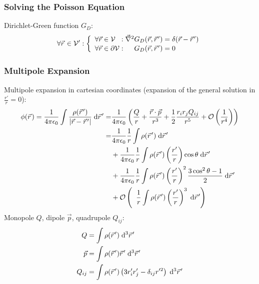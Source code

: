 		\subsubsection{Solving the Poisson Equation}
			\noindent
			Dirichlet-Green function $G_D$:
			\begin{equation}
				\forall\pvec{r}\in\mathcal{V}': \left\{\begin{array}{ll}
						\forall\vec{r}\in\mathcal{V}\phantom\partial:
						\Nabla^2 G_D(\vec{r},\pvec{r}') = \delta(\vec{r}-\pvec{r}') \\
						\forall\vec{r}\in\partial\mathcal{V}:
						\phantom{\Nabla^2}G_D(\vec{r},\pvec{r}') = 0
					\end{array}\right.
			\end{equation}

		\subsubsection{Multipole Expansion}
			\noindent
			Multipole expansion in cartesian coordinates (expansion of the general solution in $\frac{r'}{r}=0$):
			\begin{equation}
				\begin{aligned}
					\phi(\pvec{r}) = \frac{1}{4\pi\epsilon_0}\int\frac{\rho(\pvec{r}')}{\left|\vec{r}-\pvec{r}'\right|}\;\dd \pvec{r}'
					=& \frac{1}{4\pi\epsilon_0}\left(\frac{Q}{r} + \frac{\vec{r}\cdot\vec{p}}{r^3} + \frac{1}{2}\frac{r_i r_j Q_{ij}}{r^5} + \mathcal{O} \left(\frac{1}{r^4}\right)\right) \\
					=& \frac{1}{4\pi\epsilon_0}\frac{1}{r}\int\rho(\pvec{r}')\;\dd \pvec{r}' \\
					&+ \frac{1}{4\pi\epsilon_0}\frac{1}{r}\int\rho(\pvec{r}')\left(\frac{r'}{r}\right)\cos\theta\;\dd \pvec{r}' \\
					&+ \frac{1}{4\pi\epsilon_0}\frac{1}{r}\int\rho(\pvec{r}')\left(\frac{r'}{r}\right)^2\frac{3\cos^2\theta-1}{2}\;\dd \pvec{r}' \\
					&+ \mathcal{O}\left(\;\;\frac{1}{r}\int\rho(\pvec{r}')\left(\frac{r'}{r}\right)^3 \;\dd \pvec{r}'\right) \\
				\end{aligned}
			\end{equation}
			Monopole $Q$, dipole $\vec{p}$, quadrupole $Q_{ij}$:
			\begin{equation}
				\begin{aligned}
					Q &= \int \rho(\pvec{r}') \;\dd^3 \pvec{r}' \\
					\vec{p} &= \int \rho(\pvec{r}')\pvec{r}' \;\dd^3 \pvec{r}' \\
					Q_{ij} &= \int \rho(\pvec{r}')\left(3r'_i r'_j - \delta_{ij} r'^2 \right)	\;\dd^3 \pvec{r}' \\
				\end{aligned}
			\end{equation}

